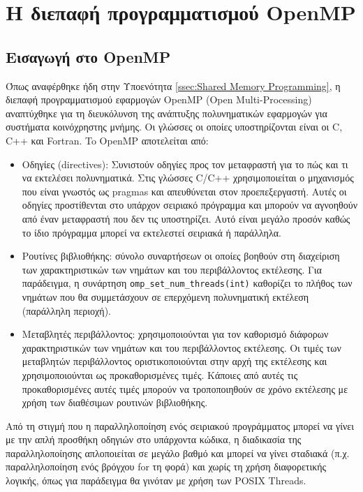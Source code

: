 \chapter{Η διεπαφή προγραμματισμού OpenMP}
\label{ch:OpenMP API}

\section{Εισαγωγή στο OpenMP}
\label{sec:Introduction to OpenMP}
Όπως αναφέρθηκε ήδη στην Υποενότητα \ref{ssec:Shared Memory Programming}, η διεπαφή προγραμματισμού εφαρμογών OpenMP (Open Multi-Processing) αναπτύχθηκε για τη διευκόλυνση της ανάπτυξης πολυνηματικών εφαρμογών για συστήματα κοινόχρηστης μνήμης. Οι γλώσσες οι οποίες υποστηρίζονται είναι οι C, C++ και Fortran.
To OpenMP αποτελείται από:
\begin{itemize}
	\item Oδηγίες (directives): Συνιστούν οδηγίες προς τον μεταφραστή για το πώς και τι να εκτελέσει πολυνηματικά. Στις γλώσσες C/C++ χρησιμοποιείται ο μηχανισμός που είναι γνωστός ως pragmas και απευθύνεται στον προεπεξεργαστή. Αυτές οι οδηγίες προστίθενται στο υπάρχον σειριακό πρόγραμμα και μπορούν να αγνοηθούν από έναν μεταφραστή που δεν τις υποστηρίζει. Αυτό είναι μεγάλο προσόν καθώς το ίδιο πρόγραμμα μπορεί να εκτελεστεί σειριακά ή παράλληλα.
	\item Ρουτίνες βιβλιοθήκης: σύνολο συναρτήσεων οι οποίες βοηθούν στη διαχείριση των χαρακτηριστικών των νημάτων και του περιβάλλοντος εκτέλεσης. Για παράδειγμα, η συνάρτηση \texttt{omp\_set\_num\_threads(int)} καθορίζει το πλήθος των νημάτων που θα συμμετάσχουν σε επερχόμενη πολυνηματική εκτέλεση (παράλληλη περιοχή).
	\item Μεταβλητές περιβάλλοντος: χρησιμοποιούνται για τον καθορισμό διάφορων χαρακτηριστικών των νημάτων και του περιβάλλοντος εκτέλεσης. Οι τιμές των μεταβλητών περιβάλλοντος οριστικοποιούνται στην αρχή της εκτέλεσης και χρησιμοποιούνται ως προκαθορισμένες τιμές. Κάποιες από αυτές τις προκαθορισμένες αυτές τιμές μπορούν να τροποποιηθούν σε χρόνο εκτέλεσης με χρήση των διαθέσιμων ρουτινών βιβλιοθήκης.
\end{itemize}

Από τη στιγμή που η παραλληλοποίηση ενός σειριακού προγράμματος μπορεί να γίνει με την απλή προσθήκη οδηγιών στο υπάρχοντα κώδικα, η διαδικασία της παραλληλοποίησης απλοποιείται σε μεγάλο βαθμό και μπορεί να γίνει σταδιακά (π.χ. παραλληλοποίηση ενός βρόγχου for τη φορά) και χωρίς τη χρήση διαφορετικής λογικής, όπως για παράδειγμα θα γινόταν με χρήση των POSIX Threads. 

